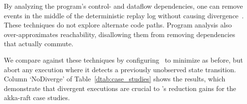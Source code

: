  By analyzing the program's control- and
dataflow dependencies, one can remove events in the middle of the deterministic
replay log without causing
divergence~\cite{Lee:2011:TGR:1993498.1993528,tallam2007enabling,huang2012lean,cai2013lock,elyasov2013guided,wang2015fast}.
These techniques do not explore alternate code paths. Program analysis also over-approximates
reachability,
disallowing them from removing dependencies that actually commute.

We compare against these techniques by configuring \sys~to minimize as before, but abort any execution
where it detects a previously unobserved state transition. Column `NoDiverge'
of Table~\ref{dtab:case_studies} shows the results, which demonstrate that
divergent executions are crucial to \sys's reduction gains for the akka-raft case studies.

%
%

